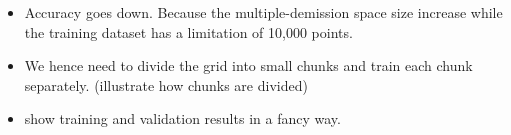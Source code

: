 



\begin{itemize}
\item Accuracy goes down. Because the multiple-demission space size increase while the training dataset has a limitation of 10,000 points.  
\item We hence need to divide the grid into small chunks and train each chunk separately.  (illustrate how chunks are divided)
\item  show training and validation results in a fancy way. 
\end{itemize}










